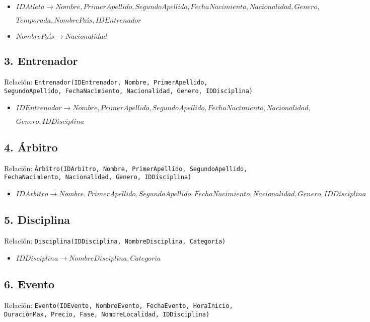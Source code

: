 \begin{itemize}
    \item $IDAtleta \rightarrow Nombre, PrimerApellido, SegundoApellido, FechaNacimiento, Nacionalidad, Genero,$

$ Temporada, NombrePaís, IDEntrenador$
    \item $NombrePaís \rightarrow Nacionalidad$
\end{itemize}

\subsection*{3. Entrenador}
Relación: \texttt{Entrenador(IDEntrenador, Nombre, PrimerApellido, SegundoApellido, FechaNacimiento, Nacionalidad, Genero, IDDisciplina)}

\begin{itemize}
    \item $IDEntrenador \rightarrow Nombre, PrimerApellido, SegundoApellido, FechaNacimiento, Nacionalidad, $

$Genero, IDDisciplina$
\end{itemize}

\subsection*{4. Árbitro}
Relación: \texttt{Árbitro(IDArbitro, Nombre, PrimerApellido, SegundoApellido, FechaNacimiento, Nacionalidad, Genero, IDDisciplina)}

\begin{itemize}
    \item $IDArbitro \rightarrow Nombre, PrimerApellido, SegundoApellido, FechaNacimiento, Nacionalidad, Genero, IDDisciplina$
\end{itemize}

\subsection*{5. Disciplina}
Relación: \texttt{Disciplina(IDDisciplina, NombreDisciplina, Categoría)}

\begin{itemize}
    \item $IDDisciplina \rightarrow NombreDisciplina, Categoria$
\end{itemize}

\subsection*{6. Evento}
Relación: \texttt{Evento(IDEvento, NombreEvento, FechaEvento, HoraInicio, DuraciónMax, Precio, Fase, NombreLocalidad, IDDisciplina)}

